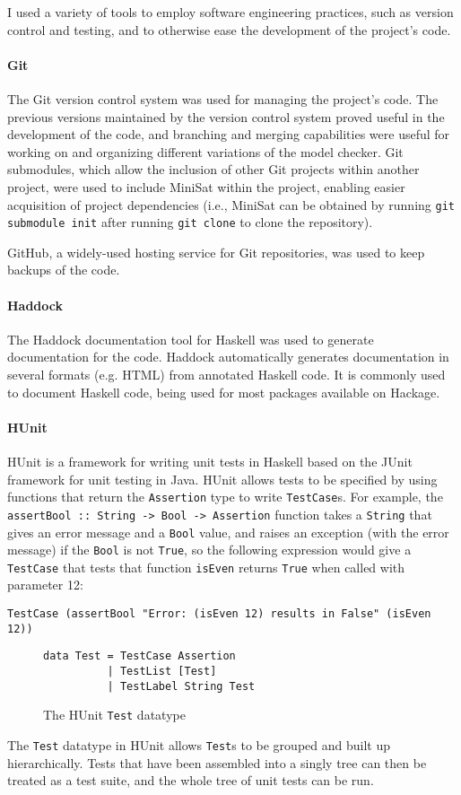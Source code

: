 \documentclass[12pt,a4paper,twoside,openright]{report}
\begin{document}
I used a variety of tools to employ software engineering practices, such
as version control and testing, and to otherwise ease the development of
the project's code.

\paragraph{Git}{
The Git version control system was used for managing the project's code. The
previous versions maintained by the version control system proved useful in
the development of the code, and branching and merging capabilities were
useful for working on and organizing different variations of the model checker.
Git submodules, which allow the inclusion of other Git projects within another
project, were used to include MiniSat within the project, enabling easier
acquisition of project dependencies (i.e., MiniSat can be obtained by running
\verb,git submodule init, after running \verb,git clone, to clone the repository).

GitHub, a widely-used hosting service for Git repositories, was used to keep
backups of the code.}

\paragraph{Haddock}{
The Haddock documentation tool for Haskell was used to generate documentation
for the code. Haddock automatically generates documentation in
several formats (e.g. HTML) from annotated Haskell code. It is commonly
used to document Haskell code, being used for most packages available
on Hackage.
}

\paragraph{HUnit}{
HUnit is a framework for writing unit tests in Haskell based on the JUnit framework
for unit testing in Java. HUnit allows tests to be specified by using functions
that return the \verb,Assertion, type to write \verb,TestCase,s. For example, the
\verb,assertBool :: String -> Bool -> Assertion, function takes a \verb,String,
that gives an error message and a \verb,Bool, value, and raises an exception (with
the error message) if the \verb,Bool, is not \verb,True,, so the following
expression would give a \verb,TestCase, that tests that function
\verb,isEven, returns \verb,True, when called with parameter 12:
\begin{verbatim}
TestCase (assertBool "Error: (isEven 12) results in False" (isEven 12))
\end{verbatim}
\begin{figure}[h]
\centering
\begin{verbatim}
data Test = TestCase Assertion
          | TestList [Test]
          | TestLabel String Test
\end{verbatim}
\caption{The HUnit {\tt Test} datatype}
\end{figure}

The \verb,Test, datatype in HUnit allows \verb,Test,s to be grouped
and built up hierarchically. Tests that have been assembled into a
singly tree can then be treated as a test suite, and the whole tree
of unit tests can be run.}
\end{document}
